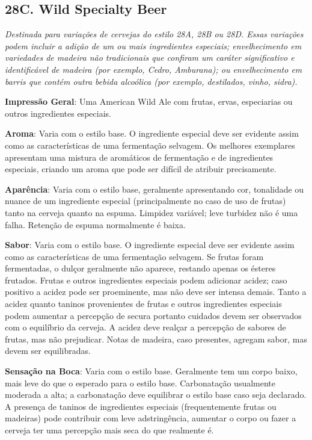 \subsection*{28C. Wild Specialty Beer}
\textit{Destinada para variações de cervejas do estilo 28A, 28B ou 28D. Essas variações podem incluir a adição de um ou mais ingredientes especiais; envelhecimento em variedades de madeira não tradicionais que confiram um caráter significativo e identificável de madeira (por exemplo, Cedro, Amburana); ou envelhecimento em barris que contém outra bebida alcoólica (por exemplo, destilados, vinho, sidra).}

\textbf{Impressão Geral}: Uma American Wild Ale com frutas, ervas, especiarias ou outros ingredientes especiais.

\textbf{Aroma}: Varia com o estilo base. O ingrediente especial deve ser evidente assim como as características de uma fermentação selvagem. Os melhores exemplares apresentam uma mistura de aromáticos de fermentação e de ingredientes especiais, criando um aroma que pode ser difícil de atribuir precisamente.

\textbf{Aparência}: Varia com o estilo base, geralmente apresentando cor, tonalidade ou nuance de um ingrediente especial (principalmente no caso de uso de frutas) tanto na cerveja quanto na espuma. Limpidez variável; leve turbidez não é uma falha. Retenção de espuma normalmente é baixa.

\textbf{Sabor}: Varia com o estilo base. O ingrediente especial deve ser evidente assim como as características de uma fermentação selvagem. Se frutas foram fermentadas, o dulçor geralmente não aparece, restando apenas os ésteres frutados. Frutas e outros ingredientes especiais podem adicionar acidez; caso positivo a acidez pode ser proeminente, mas não deve ser intensa demais. Tanto a acidez quanto taninos provenientes de frutas e outros ingredientes especiais podem aumentar a percepção de secura portanto cuidados devem ser observados com o equilíbrio da cerveja. A acidez deve realçar a percepção de sabores de frutas, mas não prejudicar. Notas de madeira, caso presentes, agregam sabor, mas devem ser equilibradas.

\textbf{Sensação na Boca}: Varia com o estilo base. Geralmente tem um corpo baixo, mais leve do que o esperado para o estilo base. Carbonatação usualmente moderada a alta; a carbonatação deve equilibrar o estilo base caso seja declarado. A presença de taninos de ingredientes especiais (frequentemente frutas ou madeiras) pode contribuir com leve adstringência, aumentar o corpo ou fazer a cerveja ter uma percepção mais seca do que realmente é.

